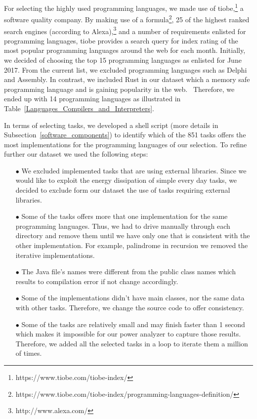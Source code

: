 For selecting the highly used programming languages, we made use 
of tiobe,\footnote{https://www.tiobe.com/tiobe-index/} a software 
quality company.
By making use of a formula\footnote{https://www.tiobe.com/tiobe-index/programming-languages-definition/}, 
25 of the highest ranked search engines (according to Alexa),\footnote{http://www.alexa.com/} 
and a number of requirements enlisted for programming languages, 
tiobe provides a search query for index rating of the most popular 
programming languages around the web for each month. 
Initially, we decided of choosing the top 15 programming languages 
as enlisted for June 2017. 
From the current list, we excluded programming languages such as 
Delphi and Assembly. 
In contrast, we included Rust in our dataset which a memory safe 
programming language and is gaining popularity in the web. \
Therefore, we ended up with 14 programming languages as illustrated 
in Table~\ref{Languages_Compilers_and_Interpreters}.

In terms of selecting tasks, we developed a shell script (more 
details in Subsection~\ref{software_components}) to identify 
which of the 851 tasks offers the most implementations for the 
programming languages of our selection. 
To refine further our dataset we used the following steps: 

\begin{enumerate}
	\item [$\bullet$] We excluded implemented tasks that are using 
	external libraries. 
	Since we would like to exploit the energy dissipation of 
	simple every day tasks, we decided to exclude form our dataset 
	the use of tasks requiring external libraries. 
	\item [$\bullet$] Some of the tasks offers more that one implementation 
	for the same programming languages. 
	Thus, we had to drive manually through each directory and remove 
	them until we have only one that is consistent with the other 
	implementation. 
	For example, palindrome in recursion we removed the iterative 
	implementations. 
	\item [$\bullet$] The Java file's names were 
	different from the public class names which results to compilation 
	error if not change accordingly. 
	\item [$\bullet$] Some of the implementations didn't have main 
	classes, nor the same data with other tasks. 
	Therefore, we change the source code to offer consistency.
	\item [$\bullet$] Some of the tasks are relatively small and may 
	finish faster than 1 second which makes it impossible for our 
	power analyzer to capture those results. 
	Therefore, we added all the selected tasks in a loop to iterate them 
	a million of times. 
\end{enumerate}



